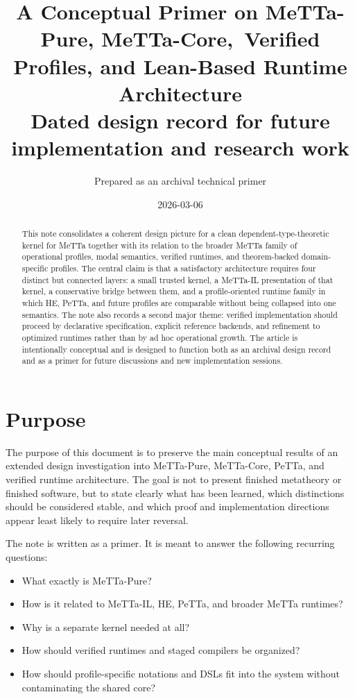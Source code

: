 \documentclass[11pt]{article}
\title{A Conceptual Primer on MeTTa-Pure, MeTTa-Core,\ Verified Profiles, and Lean-Based Runtime Architecture\\
\large Dated design record for future implementation and research work}
\author{Prepared as an archival technical primer}
\date{2026-03-06}
\begin{document}
\maketitle

\begin{abstract}
This note consolidates a coherent design picture for a clean dependent-type-theoretic kernel for MeTTa together with its relation to the broader MeTTa family of operational profiles, modal semantics, verified runtimes, and theorem-backed domain-specific profiles. The central claim is that a satisfactory architecture requires four distinct but connected layers: a small trusted kernel, a MeTTa-IL presentation of that kernel, a conservative bridge between them, and a profile-oriented runtime family in which HE, PeTTa, and future profiles are comparable without being collapsed into one semantics. The note also records a second major theme: verified implementation should proceed by declarative specification, explicit reference backends, and refinement to optimized runtimes rather than by ad hoc operational growth. The article is intentionally conceptual and is designed to function both as an archival design record and as a primer for future discussions and new implementation sessions.
\end{abstract}

\tableofcontents

\section{Purpose}

The purpose of this document is to preserve the main conceptual results of an extended design investigation into MeTTa-Pure, MeTTa-Core, PeTTa, and verified runtime architecture. The goal is not to present finished metatheory or finished software, but to state clearly what has been learned, which distinctions should be considered stable, and which proof and implementation directions appear least likely to require later reversal.

The note is written as a primer. It is meant to answer the following recurring questions:
\begin{itemize}
  \item What exactly is MeTTa-Pure?
  \item How is it related to MeTTa-IL, HE, PeTTa, and broader MeTTa runtimes?
  \item Why is a separate kernel needed at all?
  \item How should verified runtimes and staged compilers be organized?
  \item How should profile-specific notations and DSLs fit into the system without contaminating the shared core?
\end{itemize}
\end{document}

